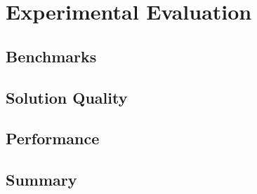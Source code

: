 \chapter{Experimental Evaluation}

\section{Benchmarks}

\section{Solution Quality}

\section{Performance}

\section{Summary}